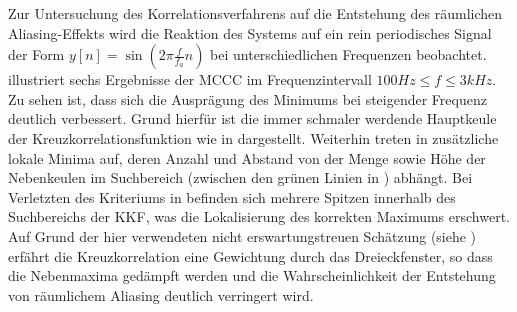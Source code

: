 Zur Untersuchung des Korrelationsverfahrens auf die Entstehung des räumlichen Aliasing-Effekts wird die Reaktion des Systems auf ein rein periodisches Signal der Form $y[n] = \sin{\left( 2 \pi \frac{f}{f_a} n \right)}$ bei unterschiedlichen Frequenzen beobachtet.  illustriert sechs Ergebnisse der MCCC im Frequenzintervall $100 Hz \leq f \leq 3kHz$. Zu sehen ist, dass sich die Ausprägung des Minimums bei steigender Frequenz deutlich verbessert. Grund hierfür ist die immer schmaler werdende Hauptkeule der Kreuzkorrelationsfunktion wie in  dargestellt. Weiterhin treten in  zusätzliche lokale Minima auf, deren Anzahl und Abstand von der Menge sowie Höhe der Nebenkeulen im Suchbereich (zwischen den grünen Linien in ) abhängt. Bei Verletzten des Kriteriums in  befinden sich mehrere Spitzen innerhalb des Suchbereichs der KKF, was die Lokalisierung des korrekten Maximums erschwert. Auf Grund der hier verwendeten nicht erswartungstreuen Schätzung (siehe ) erfährt die Kreuzkorrelation eine Gewichtung durch das Dreieckfenster, so dass die Nebenmaxima gedämpft werden und die Wahrscheinlichkeit der Entstehung von räumlichem Aliasing deutlich verringert wird.



